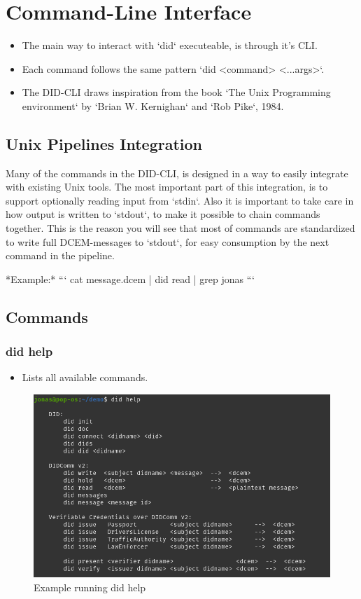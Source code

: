 \chapter{Command-Line Interface}

\begin{itemize}
\item The main way to interact with `did` executeable, is through it's CLI.
\item Each command follows the same pattern `did <command> <...args>`.
\item The DID-CLI draws inspiration from the book `The Unix Programming environment` by `Brian W. Kernighan` and `Rob Pike`, 1984.
\end{itemize}

\section{Unix Pipelines Integration}

Many of the commands in the DID-CLI, is designed in a way to easily integrate with existing Unix tools. The most important part of this integration, is to support optionally reading input from `stdin`. Also it is important to take care in how output is written to `stdout`, to make it possible to chain commands together. This is the reason you will see that most of commands are standardized to write full DCEM-messages to `stdout`, for easy consumption by the next command in the pipeline.

*Example:*
```
cat message.dcem | did read | grep jonas 
```

\newpage

\section{Commands}



\subsection{did help}
\begin{itemize}
\item Lists all available commands.
\end{itemize}
    \begin{figure}[htbp]
      \centering
      \includegraphics[width=.7\textwidth]{figures/cmd-help.png}
      \caption[]{Example running did help}
    \end{figure}
    
